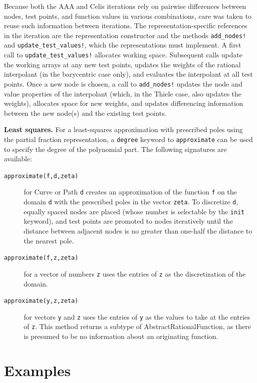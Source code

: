 \documentclass{juliacon}
\begin{document}
Because both the AAA and Celis iterations rely on pairwise differences between nodes, test points, and function values in various combinations, care was taken to reuse such information between iterations. The representation-specific references in the iteration are the representation constructor and the methods \verb|add_nodes!| and \verb|update_test_values!|, which the representations must implement. A first call to \verb|update_test_values!| allocates working space. Subsequent calls update the working arrays at any new test points, updates the weights of the rational interpolant (in the barycentric case only), and evaluates the interpolant at all test points. Once a new node is chosen, a call to \verb|add_nodes!| updates the node and value properties of the interpolant (which, in the Thiele case, also updates the weights), allocates space for new weights, and updates differencing information between the new node(s) and the existing test points. 

\textbf{Least squares.} For a least-squares approximation with prescribed poles using the partial fraction representation, a \texttt{degree} keyword to \texttt{approximate} can be used to specify the degree of the polynomial part. The following signatures are available:
\begin{description}
    \item[\texttt{approximate(f,d,zeta)}] for \textsf{Curve} or \textsf{Path} \verb|d| creates an approximation of the function \texttt{f} on the domain \verb|d| with the prescribed poles in the vector \verb|zeta|. To discretize \verb|d|, equally spaced nodes are placed (whose number is selectable by the \verb|init| keyword), and test points are promoted to nodes iteratively until the distance between adjacent nodes is no greater than one-half the distance to the nearest pole. 
    \item[\texttt{approximate(f,z,zeta)}] for a vector of numbers \verb|z| uses the entries of \verb|z| as the discretization of the domain.
    \item[\texttt{approximate(y,z,zeta)}] for vectors \verb|y| and \verb|z| uses the entries of \verb|y| as the values to take at the entries of \verb|z|. This method returns a subtype of \textsf{AbstractRationalFunction}, as there is presumed to be no information about an originating function.
\end{description}

\section{Examples}
\end{document}
